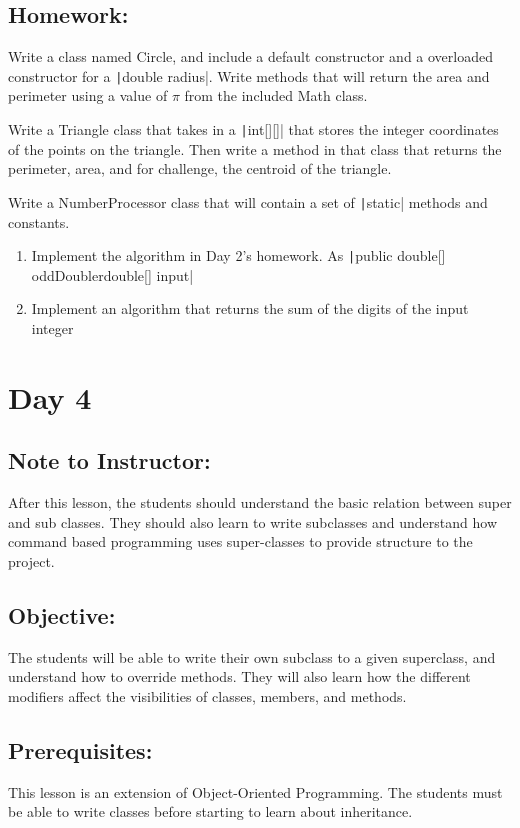 \documentclass[11pt,fleqn]{article}
\newcommand{\mil}[2][java]{\texttt|#2|}
\begin{document}
\subsection*{Homework:} Write a class named Circle, and include a default constructor and a overloaded constructor for a \mil{double radius}. Write methods that will return the area and perimeter using a value of $\pi$ from the included Math class.

Write a Triangle class that takes in a \mil{int[][]} that stores the integer coordinates of the points on the triangle. Then write a method in that class that returns the perimeter, area, and for challenge, the centroid of the triangle.

Write a NumberProcessor class that will contain a set of \mil{static} methods and constants. 
\begin{enumerate}
\item Implement the algorithm in Day 2's homework. As \mil{public double[] oddDoubler{double[] input}}
\item Implement an algorithm that returns the sum of the digits of the input integer
\end{enumerate}

\newpage

\section*{Day 4}
\subsection*{Note to Instructor:} After this lesson, the students should understand the basic relation between super and sub classes. They should also learn to write subclasses and understand how command based programming uses super-classes to provide structure to the project.

\subsection*{Objective:} The students will be able to write their own subclass to a given superclass, and understand how to override methods. They will also learn how the different modifiers affect the visibilities of classes, members, and methods.

\subsection*{Prerequisites:} This lesson is an extension of Object-Oriented Programming. The students must be able to write classes before starting to learn about inheritance.
\end{document}
